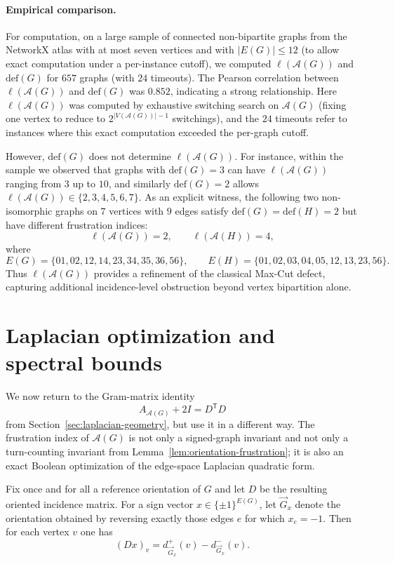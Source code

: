 \documentclass[11pt]{article}
\theoremstyle{plain}
\begin{document}
\paragraph{Empirical comparison.}
For computation, on a large sample of connected non-bipartite graphs from the NetworkX atlas
with at most seven vertices and with $|E(G)|\le 12$ (to allow exact computation under a
per-instance cutoff), we computed $\ell(\mathcal A(G))$ and $\mathrm{def}(G)$ for $657$ graphs
(with $24$ timeouts). The Pearson correlation between $\ell(\mathcal A(G))$ and $\mathrm{def}(G)$
was $0.852$, indicating a strong relationship. Here $\ell(\mathcal A(G))$ was computed by
exhaustive switching search on $\mathcal A(G)$ (fixing one vertex to reduce to
$2^{|V(\mathcal A(G))|-1}$ switchings), and the $24$ timeouts refer to instances where this
exact computation exceeded the per-graph cutoff.

However, $\mathrm{def}(G)$ does not determine $\ell(\mathcal A(G))$.
For instance, within the sample we observed that graphs with $\mathrm{def}(G)=3$ can have
$\ell(\mathcal A(G))$ ranging from $3$ up to $10$, and similarly $\mathrm{def}(G)=2$ allows
$\ell(\mathcal A(G))\in\{2,3,4,5,6,7\}$.
As an explicit witness, the following two non-isomorphic graphs on $7$ vertices with $9$ edges
satisfy $\mathrm{def}(G)=\mathrm{def}(H)=2$ but have different frustration indices:
\[
\ell(\mathcal A(G))=2,\qquad \ell(\mathcal A(H))=4,
\]
where
\[
E(G)=\{01,02,12,14,23,34,35,36,56\},\qquad
E(H)=\{01,02,03,04,05,12,13,23,56\}.
\]
Thus $\ell(\mathcal A(G))$ provides a refinement of the classical Max-Cut defect, capturing
additional incidence-level obstruction beyond vertex bipartition alone.

\section{Laplacian optimization and spectral bounds}
\label{sec:laplacian-optimization}

We now return to the Gram-matrix identity
\[
A_{\mathcal A(G)}+2I=D^{\mathsf T}D
\]
from Section~\ref{sec:laplacian-geometry}, but use it in a different way.
The frustration index of $\mathcal A(G)$ is not only a signed-graph invariant and
not only a turn-counting invariant from Lemma~\ref{lem:orientation-frustration};
it is also an exact Boolean optimization of the edge-space Laplacian quadratic
form.

Fix once and for all a reference orientation of $G$ and let $D$ be the resulting
oriented incidence matrix.
For a sign vector $x\in\{\pm1\}^{E(G)}$, let $\vec G_x$ denote the orientation
obtained by reversing exactly those edges $e$ for which $x_e=-1$.
Then for each vertex $v$ one has
\[
(Dx)_v=d^+_{\vec G_x}(v)-d^-_{\vec G_x}(v).
\]
\end{document}
